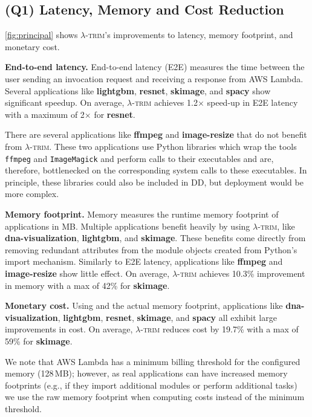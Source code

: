 \documentclass[sigplan,nonacm]{acmart}
\newcommand{\sys}{\textsc{\ensuremath{\lambda}-trim}\xspace}
\newcommand{\heading}[1]{\vspace{4pt}\noindent\textbf{#1.}}
\newcommand{\application}[1]{{\textcolor{pennblue}{\textbf{#1}}}}
\begin{document}
%
 
\subsection{(Q1) Latency, Memory and Cost Reduction}
\cref{fig:principal} shows \sys's improvements to latency, memory footprint, and monetary cost.

\heading{End-to-end latency}
End-to-end latency (E2E) measures the time between the user sending an invocation request and receiving a response from AWS Lambda.
Several applications like \application{lightgbm}, \application{resnet}, \application{skimage}, and \application{spacy} show significant speedup.
On average, \sys achieves 1.2$\times$ speed-up in E2E latency with a maximum of 2$\times$ for \application{resnet}.

There are several applications like \application{ffmpeg} and \application{image-resize} that do not benefit from \sys.
These two applications use Python libraries which wrap the tools \texttt{ffmpeg} and \texttt{ImageMagick} and perform calls to their executables and are, therefore, 
bottlenecked on the corresponding system calls to these executables.
In principle, these libraries could also be included in DD, but deployment would be more complex.



\heading{Memory footprint}
\label{ssec:eval-memory}
Memory measures the runtime memory footprint of applications in MB.
Multiple applications benefit heavily by using \sys, like \application{dna-visualization}, \application{lightgbm}, and \application{skimage}.
These benefits come directly from removing redundant attributes from the module objects created from Python's import mechanism.
Similarly to E2E latency, applications like \application{ffmpeg} and \application{image-resize} show little effect.
On average, \sys achieves 10.3\% improvement in memory with a max of 42\% for \application{skimage}.


\heading{Monetary cost}
Using  and the actual memory footprint,
applications like \application{dna-visualization}, \application{lightgbm}, \application{resnet}, \application{skimage}, and \application{spacy} all exhibit large improvements in cost.
On average, \sys reduces cost by 19.7\% with a max of 59\% for \application{skimage}.

We note that AWS Lambda has a minimum billing threshold for the configured memory (128\,MB); however,
as real applications can have increased memory footprints (e.g., if they import additional modules or perform additional tasks) we use the raw memory footprint when computing costs instead of the minimum threshold.
\end{document}
